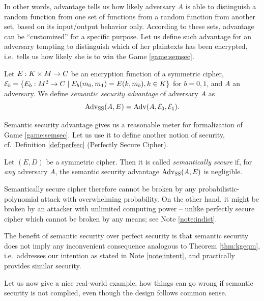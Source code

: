 In other words, advantage tells us how likely adversary $A$ is able to distinguish a random function from one set of functions from a random function from another set, based on its input/output behavior only. According to these sets, advantage can be ``customized'' for a specific purpose. Let us define such advantage for an adversary tempting to distinguish which of her plaintexts has been encrypted, i.e.\ tells us how likely she is to win the Game \ref{game:semsec}.

\begin{defn}
\label{def:ssadvant}
	Let $E: K\times M\rightarrow C$ be an encryption function of a symmetric cipher, ${\cal E}_b = \{E_b:M^2\rightarrow C \mid E_b(m_0,m_1) = E(k,m_b), k\in K\}$ for $b=0,1$, and $A$ an adversary. We define {\em semantic security advantage} of adversary $A$ as
	\[
		\operatorname*{Adv_{SS}}(A,E) = \operatorname*{Adv}(A,{\cal E}_0,{\cal E}_1) .
	\]
\end{defn}

Semantic security advantage gives us a reasonable meter for formalization of Game \ref{game:semsec}. Let us use it to define another notion of security, cf.\ Definition \ref{def:perfsec} (Perfectly Secure Cipher).

\begin{defn}
\label{def:semsec}
	Let $(E,D)$ be a symmetric cipher. Then it is called {\em semantically secure} if, for {\em any} adversary $A$, the semantic security advantage $\operatorname*{Adv_{SS}}(A,E)$ is negligible.
\end{defn}

Semantically secure cipher therefore cannot be broken by any probabilistic-polynomial attack with overwhelming probability. On the other hand, it might be broken by an attacker with unlimited computing power -- unlike perfectly secure cipher which cannot be broken by any means; see Note \ref{note:indist}.

The benefit of semantic security over perfect security is that semantic security does not imply any inconvenient consequence analogous to Theorem \ref{thm:kgeqm}, i.e.\ addresses our intention as stated in Note \ref{note:intent}, and practically provides similar security.

Let us now give a nice real-world example, how things can go wrong if semantic security is not complied, even though the design follows common sense.


